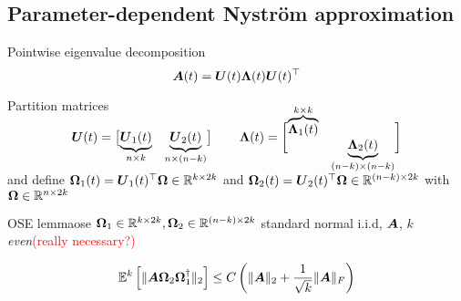 \documentclass[12pt]{article}
\begin{document}
\subsection{Parameter-dependent Nyström approximation}
\label{subsec:nystrom}

Pointwise eigenvalue decomposition
\begin{equation}
    \boldsymbol{A}(t) 
    = \boldsymbol{U}(t) \boldsymbol{\Lambda}(t) \boldsymbol{U}(t)^{\top} 
\end{equation}

Partition matrices
\begin{equation}
    \rule[\dimexpr-2ex-\ht\strutbox]{0pt}{\dimexpr2ex+2ex+\baselineskip}
    \mtx{U}(t) = \begin{bmatrix}
        \smash{\underbrace{\mtx{U}_1(t)}_{n \times k}} & \smash{\underbrace{\mtx{U}_2(t)}_{n \times (n-k)}}
    \end{bmatrix}
    \qquad 
    \mtx{\Lambda}(t) =
    \begin{bmatrix}
        \smash{\overbrace{\mtx{\Lambda}_1(t)}^{k \times k}} & \\ & \smash{\underbrace{\mtx{\Lambda}_2(t)}_{(n-k) \times (n-k)}}
    \end{bmatrix}
\end{equation}
and define $\boldsymbol{\Omega}_1(t) = \boldsymbol{U}_1(t)^{\top} \boldsymbol{\Omega} \in \mathbb{R}^{k \times 2k}$ and $\boldsymbol{\Omega}_2(t) = \boldsymbol{U}_2(t)^{\top} \boldsymbol{\Omega} \in \mathbb{R}^{(n - k) \times 2k}$ with $\boldsymbol{\Omega} \in \mathbb{R}^{n \times 2k}$

\begin{lemma}{OSE lemma}{ose}
    $\boldsymbol{\Omega}_1 \in \mathbb{R}^{k \times 2k}, \boldsymbol{\Omega}_2 \in \mathbb{R}^{(n - k) \times 2k}$ standard normal i.i.d, $\boldsymbol{A}$, $k$ \emph{even}\textcolor{red}{(really necessary?)}

    \begin{equation}
        \mathbb{E}^{k}\left[ \lVert \boldsymbol{A} \boldsymbol{\Omega}_2 \boldsymbol{\Omega}_1^{\dagger} \rVert _2 \right] \leq C \left( \lVert \boldsymbol{A} \rVert _2 + \frac{1}{\sqrt{k}}\lVert \boldsymbol{A} \rVert _F \right)
    \end{equation}
\end{lemma}
\end{document}
